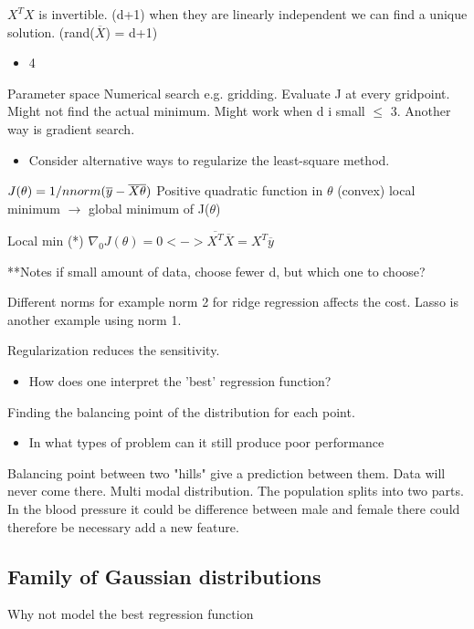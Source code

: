 $X^{T}X$ is invertible. (d+1) when they are linearly independent we can find a unique solution. (rand($\overline{X}$) = d+1)

\begin{itemize}
	\item 4
\end{itemize}
Parameter space 
Numerical search e.g. gridding. Evaluate J at every gridpoint. Might not find the actual minimum. Might work when d i small $\le$ 3. Another way is gradient search. 

\begin{itemize}
	\item Consider alternative ways to regularize the least-square method.
\end{itemize}
$J(\theta) = 1/n norm( \overline{y} - \overline{X} \overline{\theta}) \\$
Positive quadratic function in $\theta$ (convex)
local minimum $\rightarrow$ global minimum of J($\theta$) 


Local min (*) $\nabla_0 J(\theta) = 0 <-> \overline{X^T} \overline{X} = X^{T} \overline{y} $


**Notes if small amount of data, choose fewer d, but which one to choose? 


Different norms for example norm 2 for ridge regression affects the cost. 
Lasso is another example using norm 1. 


Regularization reduces the sensitivity. 


\begin{itemize}
  	\item How does one interpret the 'best' regression function?
  \end{itemize}  

Finding the balancing point of the distribution for each point. 


\begin{itemize}
	\item In what types of problem can it still produce poor performance
\end{itemize}

Balancing point between two "hills" give a prediction between them. Data will never come there. Multi modal distribution. The population splits into two parts. In the blood pressure it could be difference between male and female there could therefore be necessary add a new feature. 


\subsection{Family of Gaussian distributions}
Why not model the best regression function




